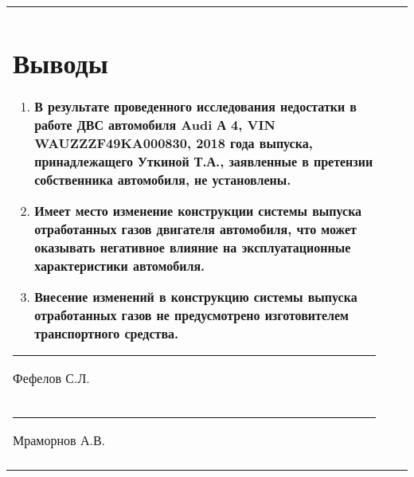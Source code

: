 \begin{longtable}{G{25mm}|M{44mm}|G{70mm}}
\section{Выводы}

\begin{enumerate}
\item \textbf{ В результате проведенного исследования  недостатки в работе ДВС автомобиля Audi А 4, VIN WAUZZZF49KA000830, 2018 года выпуска, принадлежащего Уткиной Т.А., заявленные в претензии собственника автомобиля, не установлены.}

\item  \textbf{Имеет место изменение конструкции системы выпуска отработанных газов двигателя автомобиля,  что  может оказывать негативное влияние на эксплуатационные характеристики автомобиля.%
}

\item  \textbf{Внесение изменений в конструкцию системы выпуска отработанных газов не предусмотрено изготовителем транспортного средства.} 
%
%

	
\end{enumerate}
    
\vspace{6mm}

  \hfill    \rule{45mm}{0.1 mm}     {Фефелов С.Л.}\\[5mm]

  \hfill    \rule{45mm}{0.1 mm}   {Мраморнов А.В.}\\
\relax

\vspace{5mm}


\end{longtable}
